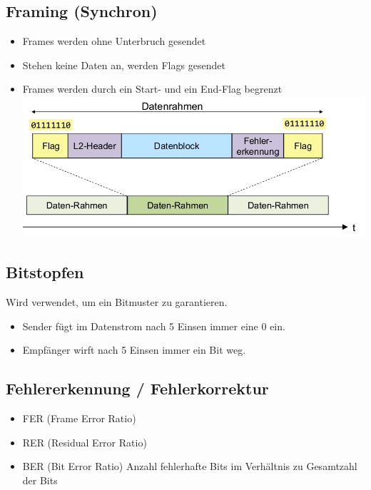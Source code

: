 \subsection{Framing (Synchron)}{

    \begin{itemize}[noitemsep]
        \item Frames werden ohne Unterbruch gesendet
        \item Stehen keine Daten an, werden Flags gesendet
        \item Frames werden durch ein Start- und ein End-Flag begrenzt
                  {\includegraphics[scale=.275]{img/framing_sync.png}}
    \end{itemize}
}

\subsection{Bitstopfen}{
    Wird verwendet, um ein Bitmuster zu garantieren.

    \begin{itemize}[noitemsep]
        \item Sender fügt im Datenstrom nach 5 Einsen immer eine 0 ein.
        \item Empfänger wirft nach 5 Einsen immer ein Bit weg.
    \end{itemize}
}


\subsection{Fehlererkennung / Fehlerkorrektur}{
    \begin{itemize}[noitemsep]
        \item FER (Frame Error Ratio)
        \item RER (Residual Error Ratio)
        \item BER (Bit Error Ratio) Anzahl fehlerhafte Bits im Verhältnis zu Gesamtzahl der Bits
    \end{itemize}
}



